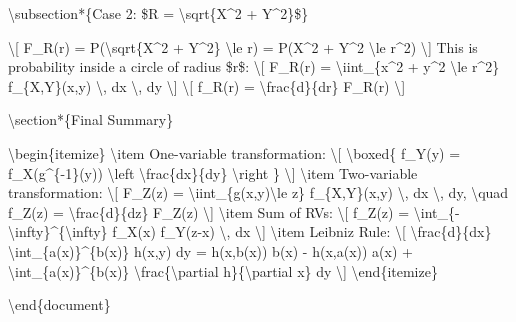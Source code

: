 \textbackslash subsection*\{Case 2: \$R = \textbackslash sqrt\{X\^{}2 +
Y\^{}2\}\$\}

\textbackslash{[} F\_R(r) = P(\textbackslash sqrt\{X\^{}2 + Y\^{}2\}
\textbackslash le r) = P(X\^{}2 + Y\^{}2 \textbackslash le r\^{}2)
\textbackslash{]} This is probability inside a circle of radius \$r\$:
\textbackslash{[} F\_R(r) = \textbackslash iint\_\{x\^{}2 + y\^{}2
\textbackslash le r\^{}2\} f\_\{X,Y\}(x,y) \textbackslash, dx
\textbackslash, dy \textbackslash{]} \textbackslash{[} f\_R(r) =
\textbackslash frac\{d\}\{dr\} F\_R(r) \textbackslash{]}

\textbackslash section*\{Final Summary\}

\textbackslash begin\{itemize\} \textbackslash item One-variable
transformation: \textbackslash{[} \textbackslash boxed\{ f\_Y(y) =
f\_X(g\^{}\{-1\}(y)) \textbackslash left\textbar{}
\textbackslash frac\{dx\}\{dy\} \textbackslash right\textbar{} \}
\textbackslash{]} \textbackslash item Two-variable transformation:
\textbackslash{[} F\_Z(z) =
\textbackslash iint\_\{g(x,y)\textbackslash le z\} f\_\{X,Y\}(x,y)
\textbackslash, dx \textbackslash, dy, \textbackslash quad f\_Z(z) =
\textbackslash frac\{d\}\{dz\} F\_Z(z) \textbackslash{]}
\textbackslash item Sum of RVs: \textbackslash{[} f\_Z(z) =
\textbackslash int\_\{-\textbackslash infty\}\^{}\{\textbackslash infty\}
f\_X(x) f\_Y(z-x) \textbackslash, dx \textbackslash{]}
\textbackslash item Leibniz Rule: \textbackslash{[}
\textbackslash frac\{d\}\{dx\} \textbackslash int\_\{a(x)\}\^{}\{b(x)\}
h(x,y) dy = h(x,b(x)) b\textquotesingle(x) - h(x,a(x))
a\textquotesingle(x) + \textbackslash int\_\{a(x)\}\^{}\{b(x)\}
\textbackslash frac\{\textbackslash partial h\}\{\textbackslash partial
x\} dy \textbackslash{]} \textbackslash end\{itemize\}

\textbackslash end\{document\}
